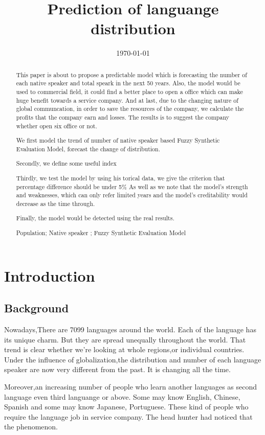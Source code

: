 \documentclass{mcmthesis}
\title{Prediction of languange distribution}
\date{\today}
\begin{document}
\begin{abstract}
\qquad This paper is about to propose a predictable model which is forecasting the number of each native speaker and total speark in the next 50 years.
Also, the model would be used to commercial field, it could find a better place to open a office which can make huge benefit towards a service company.
And at last, due to the changing nature of global communcation, in order to save the resources of the company, we calculate the profits that the company earn and losses.
The results is to suggest the company whether open six office or not.


We first model the trend of number of native speaker based Fuzzy Synthetic Evaluation Model, forecast the change of distribution.

Secondly, we define some useful index

Thirdly, we test the model by using his torical data, we give the criterion that percentage difference should be under 5\%
As well as we note that the model's strength and weaknesses, which can only refer limited years and the model's creditability would decrease as the time through.


Finally, the model would be detected using the real results.

\begin{keywords}
Population; Native speaker ; Fuzzy Synthetic Evaluation Model
\end{keywords}
\end{abstract}
\maketitle
\tableofcontents
\section{Introduction}
\subsection{Background}
\qquad Nowadays,There are 7099 languages around the world. Each of the language has its unique charm.
But they are spread unequally throughout the world. 
That trend is clear whether we’re looking at whole regions,or individual countries.
Under the influence of globalization,the distribution and number of each language speaker are now very different from the past. 
It is changing all the time.
\cite{No-of-languages}


Moreover,an increasing number of people who learn another languages as second language even third languange or above. 
Some may know English, Chinese, Spanish and some may know Japanese, Portuguese. These kind of people who require the language job in service company.
The head hunter had noticed that the phenomenon. 
\end{document}
